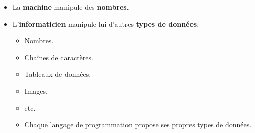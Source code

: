 \begin{slide}
	\begin{itemize}
		\item La \textbf{machine} manipule des \textbf{nombres}.
		\item L'\textbf{informaticien} manipule lui d'autres \textbf{types de données}:
		\begin{itemize}
			\item Nombres.
			\item Chaînes de caractères.
			\item Tableaux de données.
			\item Images.
			\item etc. 
			\item Chaque langage de programmation propose ses propres types de données.
		\end{itemize}
	\end{itemize}
\end{slide}

